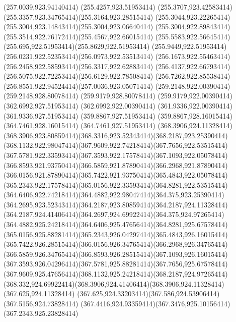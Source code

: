 {{	\closepath
	\moveto(257.0039,923.94140414)
	\lineto(255.4257,923.51953414)
	\curveto(255.3707,923.42583414)(255.3357,923.34765414)(255.3164,923.28515414)
	\curveto(255.3044,923.22265414)(255.3004,923.14843414)(255.3004,923.06640414)
	\curveto(255.3004,922.89843414)(255.3514,922.76172414)(255.4567,922.66015414)
	\curveto(255.5583,922.56645414)(255.695,922.51953414)(255.8629,922.51953414)
	\curveto(255.9449,922.51953414)(256.0231,922.52353414)(256.0973,922.53513414)
	\curveto(256.1673,922.55463414)(256.2458,922.58593414)(256.3317,922.62883414)
	\curveto(256.4137,922.66793414)(256.5075,922.72253414)(256.6129,922.78508414)
	\curveto(256.7262,922.85538414)(256.8551,922.94524414)(257.0036,923.05071414)
	\closepath
	\moveto(259.2148,922.00390414)
	\lineto(259.2148,928.80078414)
	\lineto(259.9179,928.80078414)
	\lineto(259.9179,922.00390414)
	\closepath
	\moveto(362.6992,927.51953414)
	\lineto(362.6992,922.00390414)
	\lineto(361.9336,922.00390414)
	\lineto(361.9336,927.51953414)
	\lineto(359.8867,927.51953414)
	\lineto(359.8867,928.16015414)
	\lineto(364.7461,928.16015414)
	\lineto(364.7461,927.51953414)
	\closepath
	\moveto(368.3906,924.11328414)
	\curveto(368.3906,923.80859414)(368.3316,923.52343414)(368.2187,923.25390414)
	\curveto(368.1132,922.98047414)(367.9609,922.74218414)(367.7656,922.53515414)
	\curveto(367.5781,922.33593414)(367.3593,922.17578414)(367.1093,922.05078414)
	\curveto(366.8593,921.93750414)(366.5859,921.87890414)(366.2968,921.87890414)
	\curveto(366.0156,921.87890414)(365.7422,921.93750414)(365.4843,922.05078414)
	\curveto(365.2343,922.17578414)(365.0156,922.33593414)(364.8281,922.53515414)
	\curveto(364.6406,922.74218414)(364.4882,922.98047414)(364.375,923.25390414)
	\curveto(364.2695,923.52343414)(364.2187,923.80859414)(364.2187,924.11328414)
	\curveto(364.2187,924.41406414)(364.2697,924.69922414)(364.375,924.97265414)
	\curveto(364.4882,925.24218414)(364.6406,925.47656414)(364.8281,925.67578414)
	\curveto(365.0156,925.88281414)(365.2343,926.04297414)(365.4843,926.16015414)
	\curveto(365.7422,926.28515414)(366.0156,926.34765414)(366.2968,926.34765414)
	\curveto(366.5859,926.34765414)(366.8593,926.28515414)(367.1093,926.16015414)
	\curveto(367.3593,926.04296414)(367.5781,925.88281414)(367.7656,925.67578414)
	\curveto(367.9609,925.47656414)(368.1132,925.24218414)(368.2187,924.97265414)
	\curveto(368.332,924.69922414)(368.3906,924.41406414)(368.3906,924.11328414)
	\closepath
	\moveto(367.625,924.11328414)
	\curveto(367.625,924.33203414)(367.586,924.53906414)(367.5156,924.73828414)
	\curveto(367.4416,924.93359414)(367.3476,925.10156414)(367.2343,925.23828414)
}}
